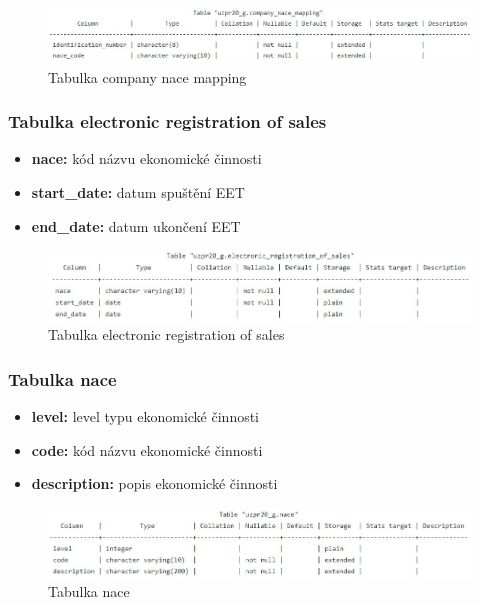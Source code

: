 \documentclass[a4paper, 12pt]{article}
\begin{document}
\begin{figure}[h!]
	\centering
	\includegraphics[width=14cm]{nace_tab.jpg}
	\caption{Tabulka company nace mapping}
\end{figure}

\subsubsection{Tabulka electronic registration of sales}
\begin{itemize}
\item \textbf{nace:} kód názvu ekonomické činnosti
\item \textbf{start\_date:} datum spuštění EET
\item \textbf{end\_date:} datum ukončení EET
\end{itemize}

\begin{figure}[h!]
	\centering
	\includegraphics[width=14cm]{eet_tab.jpg}
	\caption{Tabulka electronic registration of sales}
\end{figure}

\subsubsection{Tabulka nace}
\begin{itemize}
\item \textbf{level:} level typu ekonomické činnosti
\item \textbf{code:} kód názvu ekonomické činnosti
\item \textbf{description:} popis ekonomické činnosti
\end{itemize}

\begin{figure}[h!]
	\centering
	\includegraphics[width=14cm]{nace2_tab.jpg}
	\caption{Tabulka nace}
\end{figure}
\end{document}
